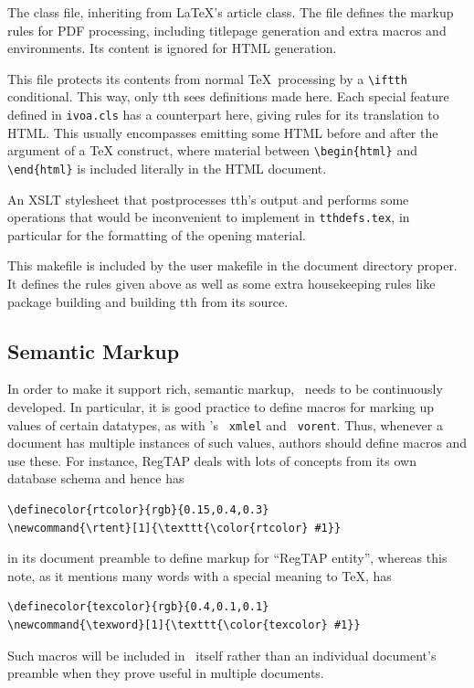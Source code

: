 \documentclass[11pt,a4paper]{ivoa}
\newcommand{\texword}[1]{\texttt{\color{texcolor} #1}}
\begin{document}
\begin{bigdescription}
\item[ivoa.cls] The class file, inheriting from \LaTeX's article class.
The file defines the markup rules for PDF processing, including
titlepage generation and extra macros and environments.  Its content is
ignored for HTML generation.

\item[tthdefs.tex] This file protects its contents from normal \TeX\
processing by a \verb|\iftth| conditional. This way, only tth sees
definitions made here. Each special feature defined in \texttt{ivoa.cls}
has a counterpart here, giving rules for its translation to HTML.  This
usually encompasses emitting some HTML before and after the argument of
a TeX construct, where material between \verb|\begin{html}| and
\verb|\end{html}| is included literally in the HTML document.

\item[tth-ivoa.xslt] An XSLT stylesheet that postprocesses tth's output
and performs some operations that would be inconvenient to implement in
\texttt{tthdefs.tex}, in particular for the formatting of the opening
material.

\item[Makefile] This makefile is included by the user makefile in the
document directory proper.  It defines the rules given above as well as
some extra housekeeping rules like package building and building tth
from its source.

\end{bigdescription}

\subsection{Semantic Markup}

In order to make it support rich, semantic markup, \ivoatex\ needs to be
continuously developed.  In particular, it is good practice to define
macros for marking up values of certain datatypes, as with \ivoatex's
\texword{xmlel} and \texword{vorent}.  
Thus, whenever a document has multiple
instances of such values, authors should define macros and use these.
For instance, RegTAP deals with lots of concepts from its own
database schema and hence has
\begin{lstlisting}
\definecolor{rtcolor}{rgb}{0.15,0.4,0.3}
\newcommand{\rtent}[1]{\texttt{\color{rtcolor} #1}}
\end{lstlisting}
in its document preamble to
define markup for ``RegTAP entity'', whereas
this note, as it mentions many words with a special meaning to \TeX, has
\begin{lstlisting}
\definecolor{texcolor}{rgb}{0.4,0.1,0.1}
\newcommand{\texword}[1]{\texttt{\color{texcolor} #1}}
\end{lstlisting}
Such macros will be included in \ivoatex\ itself rather than an
individual document's preamble when they prove useful in multiple
documents.
\end{document}
